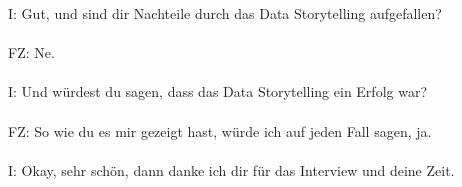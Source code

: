 \begin{linenumbers}
I: Gut, und sind dir Nachteile durch das Data Storytelling aufgefallen?
\\\\
FZ: Ne.
\\\\
I: Und würdest du sagen, dass das Data Storytelling ein Erfolg war?
\\\\
FZ: So wie du es mir gezeigt hast, würde ich auf jeden Fall sagen, ja.
\\\\
I: Okay, sehr schön, dann danke ich dir für das Interview und deine Zeit.
\end{linenumbers} 